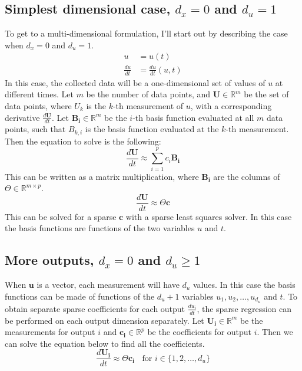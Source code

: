 \documentclass{article}
\let\vec\mathbf
\def\real{\mathbb{R}}
\begin{document}
\subsection{Simplest dimensional case, $d_x = 0$ and $d_u = 1$} \label{section:simplest}

To get to a multi-dimensional formulation, I'll start out by describing the case when $d_x = 0$ and $d_u = 1$.
\begin{align*}
u &= u(t) \\
\frac{du}{dt} &= \frac{du}{dt}(u, t)
\end{align*}
In this case, the collected data will be a one-dimensional set of values of $u$
at different times. Let $m$ be the number of data points, and $\vec{U} \in
\real^m$ be the set of data points, where $U_k$ is the $k$-th measurement of
$u$, with a corresponding derivative $\frac{d\vec{U}}{dt}$. Let $\vec{B_i} \in
\real^m$ be the $i$-th basis function evaluated at all $m$ data points, such
that $B_{k,i}$ is the basis function evaluated at the $k$-th measurement.
Then the equation to solve is the following:
\begin{equation*}
\frac{d\vec{U}}{dt} \approx \sum_{i=1}^p c_i \vec{B_i}
\end{equation*}
This can be written as a matrix multiplication, where $\vec{B_i}$ are the
columns of $\Theta \in \real^{m \times p}$.
\begin{equation}
\frac{d\vec{U}}{dt} \approx \Theta \vec{c}
\end{equation}
This can be solved for a sparse $\vec{c}$ with a sparse least squares solver. In
this case the basis functions are functions of the two variables $u$ and $t$.

\subsection{More outputs, $d_x = 0$ and $d_u \ge 1$} \label{section:more-outputs}

When $\vec{u}$ is a vector, each measurement will have $d_u$ values. In this
case the basis functions can be made of functions of the $d_u+1$ variables
$u_1,u_2,\hdots,u_{d_u}$ and $t$. To obtain separate sparse coefficients for
each output $\frac{du_i}{dt}$, the sparse regression can be performed on each
output dimension separately. Let $\vec{U_i} \in \real^{m}$ be the measurements
for output $i$ and $\vec{c_i} \in \real^p$ be the coefficients for output $i$.
Then we can solve the equation below to find all the coefficients.
\begin{equation}\label{eq:same-theta-eqs}
\frac{d\vec{U_i}}{dt} \approx \Theta \vec{c_i} \,\,\ \text{ for $i \in \{1,2,\hdots,d_u\} $}
\end{equation}
\end{document}

